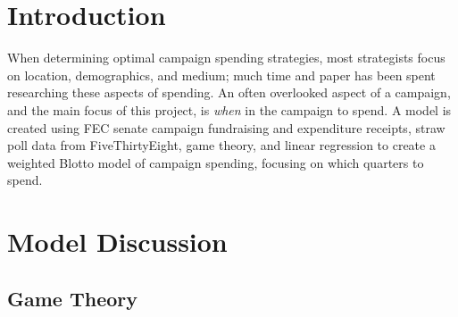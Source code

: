 \documentclass[11pt]{article}
\begin{document}
\section{Introduction}

When determining optimal campaign spending strategies, most strategists focus
on location, demographics, and medium; much time and paper has been spent
researching these aspects of spending. An often overlooked aspect of a
campaign, and the main focus of this project, is \textit{when} in the campaign
to spend. A model is created using FEC senate campaign fundraising and
expenditure receipts, straw poll data from FiveThirtyEight, game theory, and
linear regression to create a weighted Blotto model of campaign spending,
focusing on which quarters to spend.


\section{Model Discussion}

\subsection{Game Theory}
\end{document}
